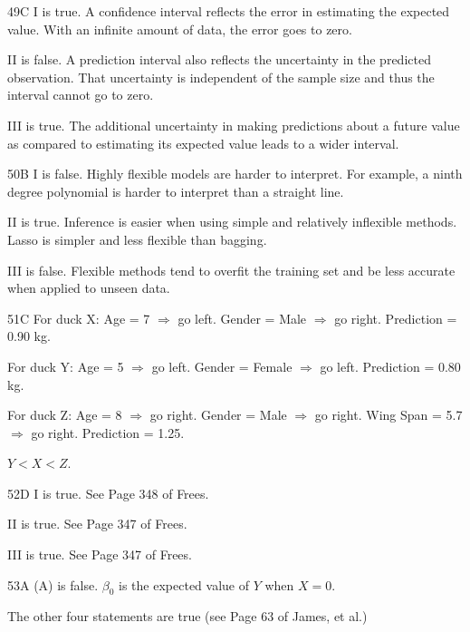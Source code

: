 \begin{solution}{49}{C}
I is true. A confidence interval reflects the error in estimating the expected value. With an infinite amount of data, the error goes to zero.

II is false. A prediction interval also reflects the uncertainty in the predicted observation. That uncertainty is independent of the sample size and thus the interval cannot go to zero.

III is true. The additional uncertainty in making predictions about a future value as compared to estimating its expected value leads to a wider interval.
\end{solution}

\begin{solution}{50}{B}
I is false. Highly flexible models are harder to interpret. For example, a ninth degree polynomial is harder to interpret than a straight line.

II is true. Inference is easier when using simple and relatively inflexible methods. Lasso is simpler and less flexible than bagging.

III is false. Flexible methods tend to overfit the training set and be less accurate when applied to unseen data.
\end{solution}

\begin{solution}{51}{C}
For duck X: Age = 7 $\Rightarrow$ go left. Gender = Male $\Rightarrow$ go right. Prediction = 0.90 kg.

For duck Y: Age = 5 $\Rightarrow$ go left. Gender = Female $\Rightarrow$ go left. Prediction = 0.80 kg.

For duck Z: Age = 8 $\Rightarrow$ go right. Gender = Male $\Rightarrow$ go right. Wing Span = 5.7 $\Rightarrow$ go right.
Prediction = 1.25.

$Y < X < Z$.
\end{solution}

\begin{solution}{52}{D}
I is true. See Page 348 of Frees.

II is true. See Page 347 of Frees.

III is true. See Page 347 of Frees.
\end{solution}

\begin{solution}{53}{A}
(A) is false. $\beta_0$ is the expected value of $Y$ when $X = 0$.

The other four statements are true (see Page 63 of James, et al.)
\end{solution}

